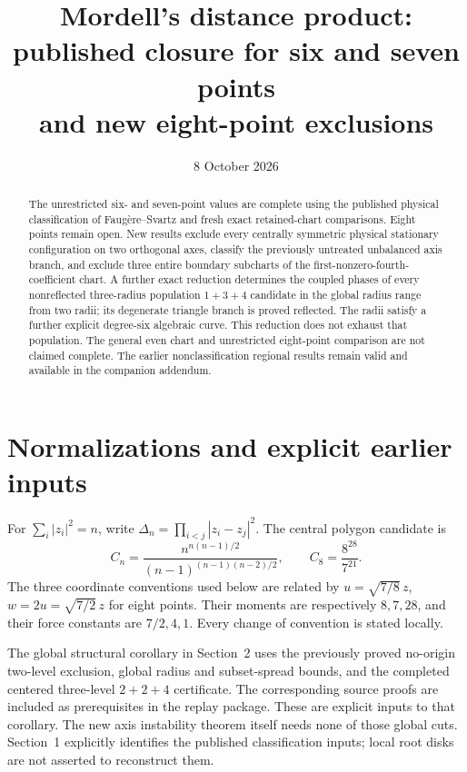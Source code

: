 \documentclass[11pt,a4paper]{article}
\title{Mordell's distance product:\\published closure for six and seven points\\and new eight-point exclusions}
\author{}
\date{8 October 2026}
\theoremstyle{remark}
\begin{document}
\maketitle
\begin{abstract}
The unrestricted six- and seven-point values are complete using the
published physical classification of Faug\`ere--Svartz and fresh exact
retained-chart comparisons. Eight points remain open. New results
exclude every centrally symmetric physical stationary configuration
on two orthogonal axes, classify the previously untreated unbalanced
axis branch, and exclude three entire boundary subcharts of the
first-nonzero-fourth-coefficient chart. A further exact reduction
determines the coupled phases of every nonreflected three-radius
population \(1+3+4\) candidate in the global radius range from two
radii; its degenerate triangle branch is proved reflected.
The radii satisfy a further explicit degree-six algebraic curve.
This reduction does not exhaust that population.
The general even chart and unrestricted eight-point comparison are
not claimed complete. The earlier nonclassification regional results
remain valid and available in the companion addendum.
\end{abstract}
\tableofcontents

\section*{Normalizations and explicit earlier inputs}
For \(\sum_i|z_i|^2=n\), write
\(\Delta_n=\prod_{i<j}|z_i-z_j|^2\). The central polygon candidate is
\[
 C_n=\frac{n^{n(n-1)/2}}
 {(n-1)^{(n-1)(n-2)/2}},
 \qquad C_8=\frac{8^{28}}{7^{21}}.
\]
The three coordinate conventions used below are related by
\(u=\sqrt{7/8}\,z\), \(w=2u=\sqrt{7/2}\,z\) for eight points.
Their moments are respectively \(8,7,28\), and their force constants
are \(7/2,4,1\). Every change of convention is stated locally.

The global structural corollary in Section~2 uses the previously
proved no-origin two-level exclusion, global radius and subset-spread
bounds, and the completed centered three-level \(2+2+4\) certificate.
The corresponding source proofs are included as prerequisites in
the replay package. These are explicit inputs to that corollary.
The new axis instability theorem itself needs none of those global
cuts. Section~1 explicitly identifies the published classification
inputs; local root disks are not asserted to reconstruct them.
\end{document}
